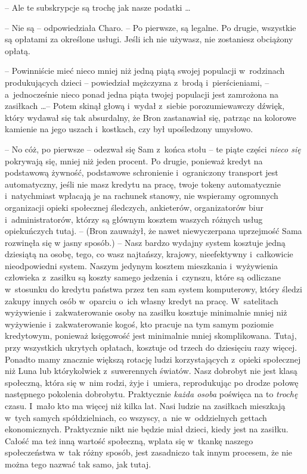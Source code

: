 \documentclass[oneside,polish,11pt,rmheadings]{mwbk}
\begin{document}
-- Ale te subskrypcje są trochę jak nasze podatki \ldots  

-- Nie są -- odpowiedziała Charo. -- Po pierwsze, są legalne. Po drugie, wszystkie są opłatami za określone usługi. Jeśli ich nie używasz, nie zostaniesz obciążony opłatą. 

-- Powinniście mieć nieco mniej niż jedną piątą swojej populacji w~rodzinach produkujących dzieci -- powiedział mężczyzna z~brodą i~pierścieniami, -- a~jednocześnie nieco ponad jedna piąta twojej populacji jest zamrożona na zasiłkach \ldots  -- Potem skinął głową i~wydał z~siebie porozumiewawczy dźwięk, który wydawał się tak absurdalny, że Bron zastanawiał się, patrząc na kolorowe kamienie na jego uszach i~kostkach, czy był upośledzony umysłowo. 

-- No cóż, po pierwsze -- odezwał się Sam z~końca stołu -- te piąte części \textit{nieco się }pokrywają się, mniej niż jeden procent. Po drugie, ponieważ kredyt na podstawową żywność, podstawowe schronienie i~ograniczony transport jest automatyczny, jeśli nie masz kredytu na pracę, twoje tokeny automatycznie i~natychmiast wpłacają je na rachunek stanowy, nie wspieramy ogromnych organizacji opieki społecznej śledczych, ankieterów, organizatorów biur i~administratorów, którzy są głównym kosztem waszych różnych usług opiekuńczych tutaj. -- (Bron zauważył, że nawet niewyczerpana uprzejmość Sama rozwinęła się w jasny sposób.) -- Nasz bardzo wydajny system kosztuje jedną dziesiątą na osobę, tego, co wasz najtańszy, krajowy, nieefektywny i~całkowicie nieodpowiedni system. Naszym jedynym kosztem mieszkania i~wyżywienia człowieka z~zasiłku są koszty samego jedzenia i~czynszu, które są odliczane w~stosunku do kredytu państwa przez ten sam system komputerowy, który śledzi zakupy innych osób w~oparciu o~ich własny kredyt na pracę. W~satelitach wyżywienie i~zakwaterowanie osoby na zasiłku kosztuje minimalnie mniej niż wyżywienie i~zakwaterowanie kogoś, kto pracuje na tym samym poziomie kredytowym, ponieważ księgowość jest minimalnie mniej skomplikowana. Tutaj, przy wszystkich ukrytych opłatach, kosztuje od trzech do dziesięciu razy więcej. Ponadto mamy znacznie większą rotację ludzi korzystających z~opieki społecznej niż Luna lub którykolwiek z~suwerennych światów. Nasz dobrobyt nie jest klasą społeczną, która się w~nim rodzi, żyje i~umiera, reprodukując po drodze połowę następnego pokolenia dobrobytu. Praktycznie \textit{każda osoba} poświęca na to \textit{trochę }czasu. I~mało kto ma więcej niż kilka lat. Nasi ludzie na zasiłkach mieszkają w~tych samych spółdzielniach, co wszyscy, a~nie w~oddzielnych gettach ekonomicznych. Praktycznie nikt nie będzie miał dzieci, kiedy jest na zasiłku. Całość ma też inną wartość społeczną, wplata się w~tkankę naszego społeczeństwa w~tak różny sposób, jest zasadniczo tak innym procesem, że nie można tego nazwać tak samo, jak tutaj. 
\end{document}
